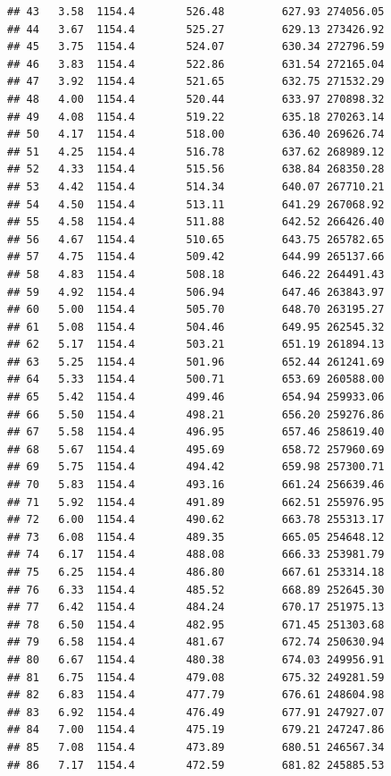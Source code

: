 \documentclass[]{article}
\begin{document}
\begin{verbatim}
## 43   3.58  1154.4        526.48         627.93 274056.05
## 44   3.67  1154.4        525.27         629.13 273426.92
## 45   3.75  1154.4        524.07         630.34 272796.59
## 46   3.83  1154.4        522.86         631.54 272165.04
## 47   3.92  1154.4        521.65         632.75 271532.29
## 48   4.00  1154.4        520.44         633.97 270898.32
## 49   4.08  1154.4        519.22         635.18 270263.14
## 50   4.17  1154.4        518.00         636.40 269626.74
## 51   4.25  1154.4        516.78         637.62 268989.12
## 52   4.33  1154.4        515.56         638.84 268350.28
## 53   4.42  1154.4        514.34         640.07 267710.21
## 54   4.50  1154.4        513.11         641.29 267068.92
## 55   4.58  1154.4        511.88         642.52 266426.40
## 56   4.67  1154.4        510.65         643.75 265782.65
## 57   4.75  1154.4        509.42         644.99 265137.66
## 58   4.83  1154.4        508.18         646.22 264491.43
## 59   4.92  1154.4        506.94         647.46 263843.97
## 60   5.00  1154.4        505.70         648.70 263195.27
## 61   5.08  1154.4        504.46         649.95 262545.32
## 62   5.17  1154.4        503.21         651.19 261894.13
## 63   5.25  1154.4        501.96         652.44 261241.69
## 64   5.33  1154.4        500.71         653.69 260588.00
## 65   5.42  1154.4        499.46         654.94 259933.06
## 66   5.50  1154.4        498.21         656.20 259276.86
## 67   5.58  1154.4        496.95         657.46 258619.40
## 68   5.67  1154.4        495.69         658.72 257960.69
## 69   5.75  1154.4        494.42         659.98 257300.71
## 70   5.83  1154.4        493.16         661.24 256639.46
## 71   5.92  1154.4        491.89         662.51 255976.95
## 72   6.00  1154.4        490.62         663.78 255313.17
## 73   6.08  1154.4        489.35         665.05 254648.12
## 74   6.17  1154.4        488.08         666.33 253981.79
## 75   6.25  1154.4        486.80         667.61 253314.18
## 76   6.33  1154.4        485.52         668.89 252645.30
## 77   6.42  1154.4        484.24         670.17 251975.13
## 78   6.50  1154.4        482.95         671.45 251303.68
## 79   6.58  1154.4        481.67         672.74 250630.94
## 80   6.67  1154.4        480.38         674.03 249956.91
## 81   6.75  1154.4        479.08         675.32 249281.59
## 82   6.83  1154.4        477.79         676.61 248604.98
## 83   6.92  1154.4        476.49         677.91 247927.07
## 84   7.00  1154.4        475.19         679.21 247247.86
## 85   7.08  1154.4        473.89         680.51 246567.34
## 86   7.17  1154.4        472.59         681.82 245885.53

\end{verbatim}
\end{document}
